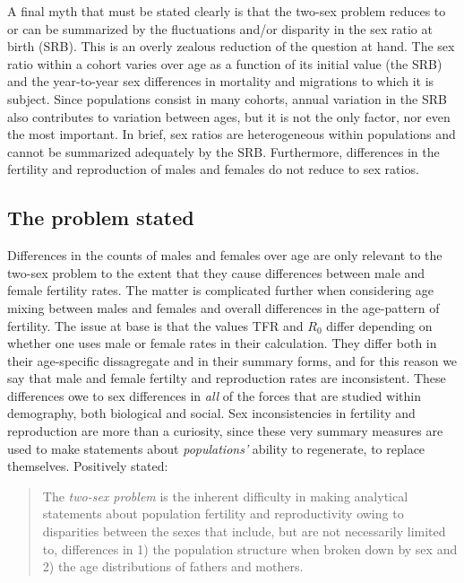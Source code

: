 \documentclass[reqno,12pt,oneside,a4paper]{report} %
\theoremstyle{plain}
\theoremstyle{definition}
\theoremstyle{remark}
\numberwithin{theorem}{chapter}     %
\begin{document}
A final myth that must be stated clearly is that the two-sex problem reduces to or can be summarized by the fluctuations and/or disparity in the sex ratio at birth (SRB). This is an overly zealous reduction of the question at hand. The sex ratio within a cohort varies over age as a function of its initial value (the SRB) and the year-to-year sex differences in mortality and migrations to which it is subject. Since populations consist in many cohorts, annual variation in the SRB also contributes to variation between ages, but it is not the only factor, nor even the most important. In brief, sex ratios are heterogeneous within populations and cannot be summarized adequately by the SRB. Furthermore, differences in the fertility and reproduction of males and females do not reduce to sex ratios.

	\subsection{The problem stated}

Differences in the counts of males and females over age are only relevant to the two-sex problem to the extent that they cause differences between male and female fertility rates. The matter is complicated further when considering age mixing between males and females and overall differences in the age-pattern of fertility. The issue at base is that the values TFR and $R_0$ differ depending on whether one uses male or female rates in their calculation. They differ both in their age-specific dissagregate and in their summary forms, and for this reason we say that male and female fertilty and reproduction rates are inconsistent. These differences owe to sex differences in \textit{all} of the forces that are studied within demography, both biological and social. Sex inconsistencies in fertility and reproduction are more than a curiosity, since these very summary measures are used to make statements about \textit{populations'} ability to regenerate, to replace themselves. Positively stated: 

\begin{quote}
The \textit{two-sex problem} is the inherent difficulty in making analytical statements about population fertility and reproductivity owing to disparities between the sexes that include, but are not necessarily limited to, differences in 1) the population structure when broken down by sex and 2) the age distributions of fathers and mothers.
\end{quote}
\end{document}
